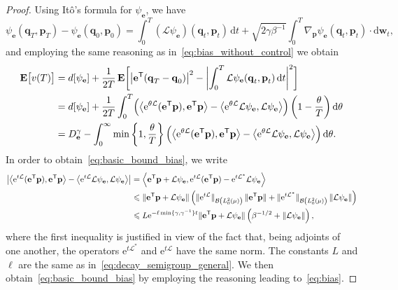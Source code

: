 \documentclass[11pt,a4paper]{article}
\newcommand{\e}{\mathrm{e}}
\newcommand{\expect}[0]{\mathbf{E}}
\newcommand{\grad}{\nabla}
\newcommand{\vect}[1]{\boldsymbol{\mathbf #1}}
\renewcommand{\d}{\mathrm d}
\renewcommand{\t}{\mathsf T}
\theoremstyle{plain}
\numberwithin{equation}{section}
\renewcommand{\leq}{\leqslant}
\begin{document}
\begin{proof}
    Using Itô's formula for $\psi_{\vect e}$,
    we have
    \[
        \psi_{\vect e}(\vect q_T, \vect p_T) - \psi_{\vect e}(\vect q_0, \vect p_0)
        = \int_{0}^{T} (\mathcal L \psi_{\vect e}) (\vect q_t, \vect p_t) \, \d t
        + \sqrt{2 \gamma \beta^{-1}} \int_{0}^{T} \grad_{\vect p} \psi_{\vect e} (\vect q_t, \vect p_t) \cdot \d \vect w_t,
    \]
    and employing the same reasoning as in~\eqref{eq:bias_without_control} we obtain
    \begin{align*}
        \expect \bigl[v(T)\bigr]
    &= d[\psi_{\vect e}] +  \frac{1}{2T} \, \expect \biggl[ \bigl\lvert \vect e^\t (\vect q_T - \vect q_0) \bigr\rvert^2 - \biggl| \int_0^T {\mathcal L \psi_{\vect e}}(\vect q_t, \vect p_t) \, \d t \biggr|^2 \biggr] \\
    &= d[\psi_{\vect e}] +  \frac{1}{2T}  \int_{0}^{T} \Bigl( \ip{\e^{\theta \mathcal L}(\vect e^\t \vect p)}{\vect e^\t \vect p} - \ip{\e^{\theta \mathcal L} \mathcal L \psi_{\vect e}}{\mathcal L \psi_{\vect e}} \Bigr) \left( 1 - \frac{\theta}{T} \right) \d \theta \\
    &= D^{\gamma}_{\vect e} - \int_{0}^{\infty} \min\left\{1, \frac{\theta}{T}\right\} \Bigl( \ip{\e^{\theta \mathcal L}(\vect e^\t \vect p)}{\vect e^\t  \vect p} - \ip{\e^{\theta \mathcal L} \mathcal L \psi_{\vect e}}{\mathcal L \psi_{\vect e}} \Bigr) \, \d \theta.
    \end{align*}
    In order to obtain~\eqref{eq:basic_bound_bias}, we write
    \begin{align*}
        \left\lvert \ip{\e^{t \mathcal L}(\vect e^\t \vect p)}{\vect e^\t \vect p} - \ip{\e^{t \mathcal L} \mathcal L \psi_{\vect e}}{\mathcal L \psi_{\vect e}} \right\rvert
    &= \ip{\vect e^\t \vect p + \mathcal L \psi_{\vect e}}{\e^{t \mathcal L} (\vect e^\t \vect p) - \e^{t \mathcal L^*} \mathcal  L\psi_{\vect e}} \\
    &\leq \norm*{\vect e^\t \vect p + \mathcal L \psi_{\vect e}}
    \left( \norm*{\e^{t \mathcal L}}[\mathcal B\left(L^2_0(\mu) \right)] \, \norm*{\vect e^\t \vect p} + \norm*{\e^{t \mathcal L^*}}[\mathcal B\left(L^2_0(\mu) \right)] \norm{\mathcal L \psi_{\vect e}} \right) \\
    &\leq L \e^{- \ell \min\{\gamma, \gamma^{-1}\} t} \norm*{\vect e^\t \vect p + \mathcal L\psi_{\vect e}}  \left(\beta^{-1/2} + \norm{\mathcal L \psi_{\vect e}} \right),
    \end{align*}
    where the first inequality is justified in view of the fact that,
    being adjoints of one another,
    the operators $\e^{t \mathcal L^*}$ and $\e^{t \mathcal L}$ have the same norm.
    The constants $L$ and $\ell$ are the same as in~\eqref{eq:decay_semigroup_general}.
    We then obtain~\eqref{eq:basic_bound_bias} by employing the reasoning leading to~\eqref{eq:bias}.
\end{proof}
\end{document}
